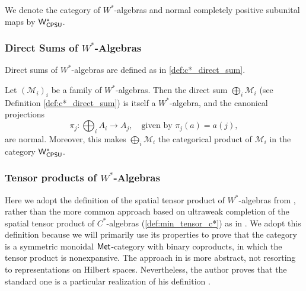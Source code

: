\begin{definition}
  We denote the category of $W^*$-algebras and normal completely positive subunital maps by $\mathsf{W^*_{CPSU}}$.
\end{definition}

\subsubsection{Direct Sums of $W^*$-Algebras}

Direct sums of $W^*$-algebras are defined as in \autoref{def:c*_direct_sum}.


\begin{proposition} \cite[Exercise 47 IV]{westerbaanCategoryNeumannAlgebras2019}  \label{prop:wcpsu_products}
  Let \( (\mathscr{M}_i)_i \) be a family of $W^*$-algebras. Then the direct sum \( \bigoplus_i \mathscr{M}_i \) (see Definition \ref{def:c*_direct_sum}) is itself a $W^*$-algebra, and the canonical projections
\[
\pi_j : \bigoplus_i A_i \to A_j, \quad \text{given by } \pi_j(a) = a(j),
\]
are normal.
Moreover, this makes \( \bigoplus_i \mathscr{M}_i \) the categorical product of \( \mathscr{M}_i \) in the category $\mathsf{W^*_{CPSU}}$.
\end{proposition}


\subsubsection{Tensor products of $W^*$-Algebras}

Here we adopt the definition of the spatial tensor product of $W^*$-algebras from \cite{westerbaanCategoryNeumannAlgebras2019}, rather than the more common approach based on ultraweak completion of the spatial tensor product of $C^*$-algebras (\autoref{def:min_tensor_c*}) as in \cite{takesakiTheoryOperatorAlgebras1979,sakaiCAlgebrasWAlgebras1998}. We adopt this definition because we will primarily use its properties to prove that the category is a symmetric monoidal $\mathsf{Met}$-category with binary coproducts, in which the tensor product is nonexpansive.
The approach in \cite{westerbaanCategoryNeumannAlgebras2019} is more abstract, not resorting to representations on Hilbert spaces. Nevertheless, the author proves that the standard one is a particular realization of his definition  \cite[Theorem 111 VII]{westerbaanCategoryNeumannAlgebras2019}.


